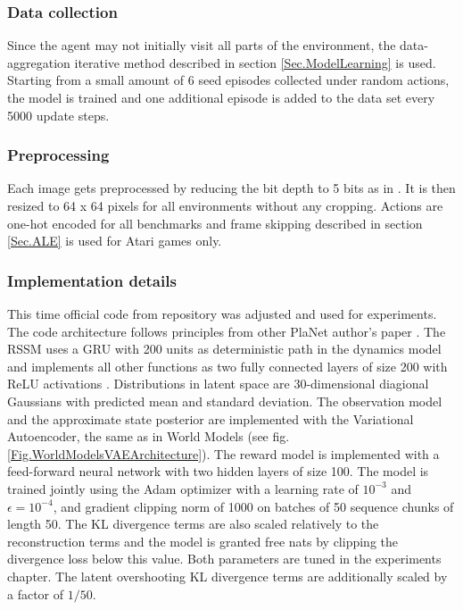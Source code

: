 \subsubsection{Data collection}

Since the agent may not initially visit all parts of the environment, the data-aggregation iterative method described in section \ref{Sec.ModelLearning} is used. Starting from a small amount of 6 seed episodes collected under random actions, the model is trained and one additional episode is added to the data set every 5000 update steps.

\subsubsection{Preprocessing}

Each image gets preprocessed by reducing the bit depth to 5 bits as in \cite{Algo.Glow5bit}. It is then resized to 64 x 64 pixels for all environments without any cropping.
Actions are one-hot encoded for all benchmarks and frame skipping described in section \ref{Sec.ALE} is used for Atari games only.

\subsubsection{Implementation details}

This time official code from repository \cite{Code.PlaNet} was adjusted and used for experiments. The code architecture follows principles from other PlaNet author's paper \cite{Code.TFAgents}.
The RSSM uses a GRU \cite{Algo.GRU} with 200 units as deterministic path in the dynamics model and implements all other functions as two fully connected layers of size 200 with ReLU activations \cite{Algo.ReLU}. Distributions in latent space are 30-dimensional diagional Gaussians with predicted mean and standard deviation.
The observation model and the approximate state posterior are implemented with the Variational Autoencoder, the same as in World Models (see fig.\ref{Fig.WorldModelsVAEArchitecture}). The reward model is implemented with a feed-forward neural network with two hidden layers of size 100.
The model is trained jointly using the Adam optimizer \cite{Algo.Adam} with a learning rate of $10^{-3}$ and $\epsilon = 10^{−4}$, and gradient clipping norm of 1000 on batches of 50 sequence chunks of length 50. The KL divergence terms are also scaled relatively to the reconstruction terms and the model is granted free nats by clipping the divergence loss below this value. Both parameters are tuned in the experiments chapter. The latent overshooting KL divergence terms are additionally scaled by a factor of $1/50$.

